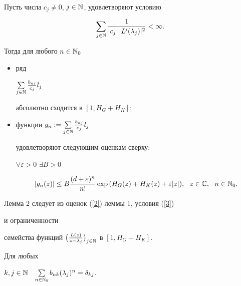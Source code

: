 \begin{lem}


Пусть числа $c_j\ne 0$, $j\in\Bbb N$, удовлетворяют условию


\begin{equation}


\label{3}


\sum\limits_{j\in\Bbb N}


\frac{1}{|c_j|\,|L'(\lambda_j)|^2}<\infty.


\end{equation}


Тогда для любого $n\in\Bbb N_0$


\begin{itemize}


\item[а)] ряд


$\sum\limits_{j\in\Bbb N}\frac{b_{nj}}{c_j}l_j$


абсолютно сходится в $[1,H_G+H_K];$


\item[б)] функции $g_n:=\sum\limits_{j\in\Bbb N}


\frac{b_{nj}}{c_j}l_j$


удовлетворяют следующим оценкам сверху\/${:}$


$\forall \varepsilon>0$ $\exists B>0$


$$


|g_n(z)|\le B\displaystyle\frac{(d+\varepsilon)^n}{n!}


\exp{(H_G(z)+H_K(z)+\varepsilon|z|)},\ \ z\in\Bbb C,\ \ n\in\Bbb N_0.


$$


\end{itemize}


\end{lem}





Лемма 2 следует из оценок (\ref{2}) леммы 1, условия (\ref{3})


и ограниченности


семейства функций $\big(\frac{L(z)}{z-\lambda_j}


\big)_{j\in\Bbb N}$ в $[1,H_G+H_K]$.





\begin{lem}


Для любых


$k,j\in\Bbb N$ \ $\sum\limits_{n\in\Bbb N_0}


b_{nk}(\lambda_j)^{n}=\delta_{kj}$.


\end{lem}





